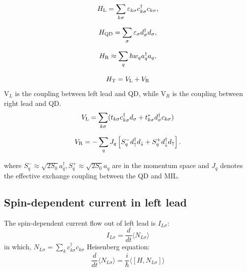 \documentclass[11pt,a4paper]{article}
\begin{document}
\begin{equation}
H_{\rm{L}} = \sum_{k\sigma} \varepsilon_{k\sigma} c_{k \sigma}^{\dagger} c_{k \sigma},
\end{equation}

\begin{equation}
H_{\rm{QD}} = \sum_{\sigma}\varepsilon_{\sigma} d_{\sigma}^{\dagger} d_{\sigma},
\end{equation}

\begin{equation}
H_{\rm{R}} \approx \sum_{q} \hbar w_{q} a_{q}^{\dagger} a_{q},
\end{equation}

\begin{equation}
H_{\rm{T}} = V_{\rm{L}} + V_{\rm{R}}
\end{equation}
V$_{L}$ is the coupling between left lead and QD, while V$_{R}$ is the coupling between right lead and QD.
\begin{equation}
V_{\rm{L}} = \sum_{k\sigma}( t_{k\sigma} c_{k \sigma}^{\dagger} d_{\sigma} + t_{k\sigma}^{*} d_{\sigma}^{\dagger} c_{k\sigma})
\end{equation}

\begin{equation}
V_{\rm{R}}=-\sum_{q} J_{q}\left[S_{q}^{-} d_{\uparrow}^{\dagger} d_{\downarrow}+S_{q}^{+} d_{\downarrow}^{\dagger} d_{\uparrow}\right].
\end{equation}

where $S_{q}^{-} \approx \sqrt{2 S_{0}} a_{q}^{\dagger}, S_{q}^{+} \approx \sqrt{2 S_{0}} a_{q}$ are in the momentum space and $J_{q}$ denotes the effective exchange coupling between the QD and MIL.
\subsection{Spin-dependent current in left lead}
The spin-dependent current flow out of left lead is $I_{L\sigma}$:
\begin{equation}
I_{L\sigma} = \frac{d}{dt} \langle N_{L\sigma} \rangle
\end{equation}
in which, $N_{L\sigma} = \sum_{k} c_{k\sigma}^{\dag}c_{k\sigma}$
Heisenberg equation:
\begin{equation}
\frac{d}{dt} \langle N_{L\sigma} \rangle = \frac{i}{\hbar} \langle [H, N_{L\sigma}]\rangle
\end{equation}
\end{document}

